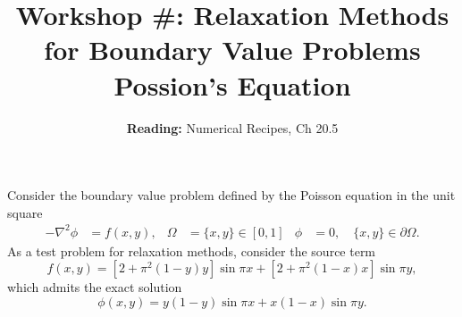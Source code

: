 \documentclass[11pt]{article}
\title{Workshop \#: Relaxation Methods for Boundary Value Problems \\ Possion's Equation }
\author{\textbf{Reading: } Numerical Recipes, Ch 20.5 }
\date{}                                           %
\begin{document}
\maketitle

 Consider the boundary value problem defined by the Poisson equation in the unit square
\begin{align}
-\nabla^2 \phi &= f(x,y), &  \Omega &= \{x,y\} \in [0,1] & \phi &= 0, \quad \{x,y\} \in \partial \Omega.
\end{align}
As a test problem for relaxation methods, consider the source term
\begin{equation}
f(x,y) = [2 + \pi^2(1-y)y] \sin{\pi x} + [2 + \pi^2(1-x)x] \sin{\pi y},
\end{equation}
which admits the exact solution
\begin{equation}
\phi(x,y) = y(1-y) \sin{\pi x} + x(1-x) \sin{\pi y}.
\end{equation}
\dotfill
\end{document}
